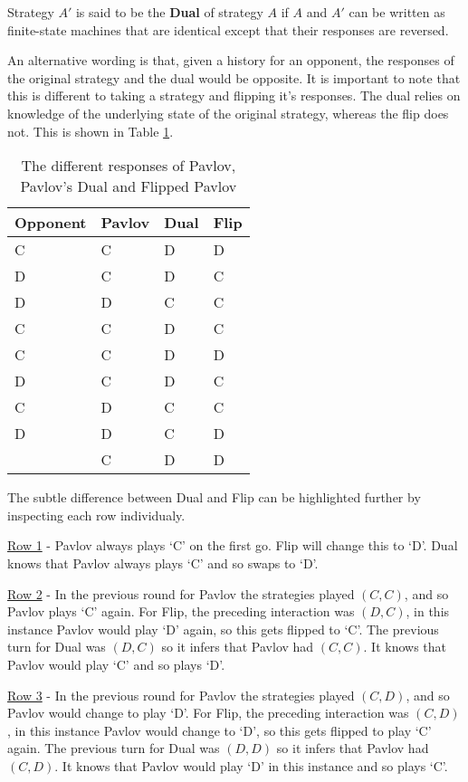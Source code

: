 \begin{definition}\label{def:dual}
Strategy $A'$ is said to be the \textbf{Dual} of strategy $A$ if $A$ and $A'$ can be written as finite-state machines that are identical except that their responses are reversed.
\end{definition}

An alternative wording is that, given a history for an opponent, the responses of the original strategy and the dual would be opposite.
It is important to note that this is different to taking a strategy and flipping it's responses.
The dual relies on knowledge of the underlying state of the original strategy, whereas the flip does not.
This is shown in Table \ref{tab:strat-dual-flip}.

\begin{table}[htbp]
\centering
\begin{tabular}{l l l l}
\toprule
Opponent & Pavlov & Dual & Flip \\
\midrule
C & C & D & D \\
D & C & D & C \\
D & D & C & C \\
C & C & D & C \\
C & C & D & D \\
D & C & D & C \\
C & D & C & C \\
D & D & C & D \\
  & C & D & D \\
\bottomrule
\end{tabular}
\caption{The different responses of Pavlov, Pavlov's Dual and Flipped Pavlov}
\label{tab:strat-dual-flip}
\end{table}

The subtle difference between Dual and Flip can be highlighted further by inspecting each row individualy.

\underline{Row 1} - Pavlov always plays `C' on the first go.
Flip will change this to `D'.
Dual knows that Pavlov always plays `C' and so swaps to `D'.

\underline{Row 2} - In the previous round for Pavlov the strategies played $(C, C)$, and so Pavlov plays `C' again.
For Flip, the preceding interaction was $(D, C)$, in this instance Pavlov would play `D' again, so this gets flipped to `C'.
The previous turn for Dual was $(D, C)$ so it infers that Pavlov had $(C, C)$.
It knows that Pavlov would play `C' and so plays `D'.

\underline{Row 3} - In the previous round for Pavlov the strategies played $(C, D)$, and so Pavlov would change to play `D'.
For Flip, the preceding interaction was $(C, D)$, in this instance Pavlov would change to `D', so this gets flipped to play `C' again.
The previous turn for Dual was $(D, D)$ so it infers that Pavlov had $(C, D)$.
It knows that Pavlov would play `D' in this instance and so plays `C'.



